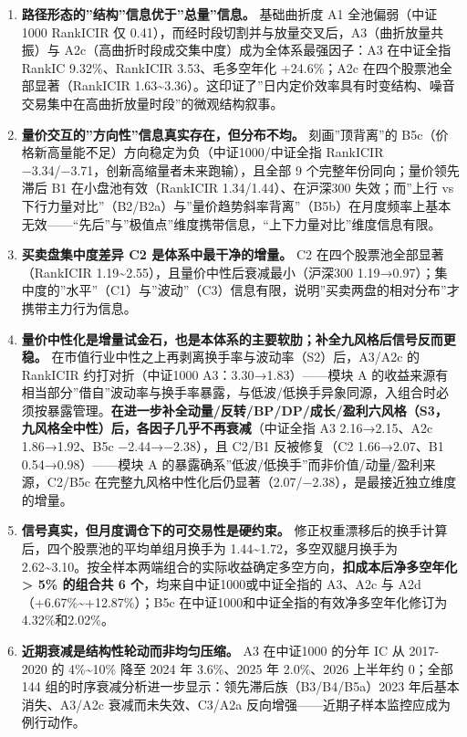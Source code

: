 \documentclass[UTF8,a4paper,zihao=-4,fontset=windows]{ctexart}
\providecommand{\tightlist}{\setlength{\itemsep}{0pt}\setlength{\parskip}{0pt}}
\begin{document}
\begin{enumerate}
\def\labelenumi{\arabic{enumi}.}
\tightlist
\item
  \textbf{路径形态的''结构''信息优于''总量''信息。} 基础曲折度 A1
  全池偏弱（中证1000 RankICIR 仅
  0.41），而经时段切割并与放量交叉后，A3（曲折放量共振）与
  A2c（高曲折时段成交集中度）成为全体系最强因子：A3 在中证全指 RankIC
  9.32\%、RankICIR 3.53、毛多空年化 +24.6\%；A2c
  在四个股票池全部显著（RankICIR
  1.63\textasciitilde3.36）。这印证了''日内定价效率具有时变结构、噪音交易集中在高曲折放量时段''的微观结构叙事。
\item
  \textbf{量价交互的''方向性''信息真实存在，但分布不均。}
  刻画''顶背离''的
  B5c（价格新高量能不足）方向稳定为负（中证1000/中证全指 RankICIR
  −3.34/−3.71，创新高缩量者未来跑输），且全部 9
  个完整年份同向；量价领先滞后 B1 在小盘池有效（RankICIR
  1.34/1.44）、在沪深300 失效；而''上行 vs
  下行力量对比''（B2/B2a）与''量价趋势斜率背离''（B5b）在月度频率上基本无效------``先后''与''极值点''维度携带信息，``上下力量对比''维度信息有限。
\item
  \textbf{买卖盘集中度差异 C2 是体系中最干净的增量。} C2
  在四个股票池全部显著（RankICIR
  1.19\textasciitilde2.55），且量价中性后衰减最小（沪深300
  1.19→0.97）；集中度的''水平''（C1）与''波动''（C3）信息有限，说明''买卖两盘的相对分布''才携带主力行为信息。
\item
  \textbf{量价中性化是增量试金石，也是本体系的主要软肋；补全九风格后信号反而更稳。}
  在市值行业中性之上再剥离换手率与波动率（S2）后，A3/A2c 的 RankICIR
  约打对折（中证1000 A3：3.30→1.83）------模块 A
  的收益来源有相当部分''借自''波动率与换手率暴露，与低波/低换手异象同源，入组合时必须按暴露管理。\textbf{在进一步补全动量/反转/BP/DP/成长/盈利六风格（S3，九风格全中性）后，各因子几乎不再衰减}（中证全指
  A3 2.16→2.15、A2c 1.86→1.92、B5c −2.44→−2.38），且 C2/B1 反被修复（C2
  1.66→2.07、B1 0.54→0.98）------模块 A
  的暴露确系''低波/低换手''而非价值/动量/盈利来源，C2/B5c
  在完整九风格中性化后仍显著（2.07/−2.38），是最接近独立维度的增量。
\item
  \textbf{信号真实，但月度调仓下的可交易性是硬约束。}
  修正权重漂移后的换手计算后，四个股票池的平均单组月换手为
  1.44\textasciitilde1.72，多空双腿月换手为
  2.62\textasciitilde3.10。按全样本两端组合的实际收益确定多空方向，\textbf{扣成本后净多空年化
  \textgreater{} 5\% 的组合共 6 个}，均来自中证1000或中证全指的
  A3、A2c 与 A2d（+6.67\%\textasciitilde+12.87\%）；B5c 在中证1000和中证全指的有效净多空年化修订为 4.32\%和2.02\%。
\item
  \textbf{近期衰减是结构性轮动而非均匀压缩。} A3 在中证1000 的分年 IC 从
  2017-2020 的 4\%\textasciitilde10\% 降至 2024 年 3.6\%、2025 年
  2.0\%、2026 上半年约 0；全部 144
  组的时序衰减分析进一步显示：领先滞后族（B3/B4/B5a）2023
  年后基本消失、A3/A2c 衰减而未失效、C3/A2a
  反向增强------近期子样本监控应成为例行动作。
\end{enumerate}
\end{document}

